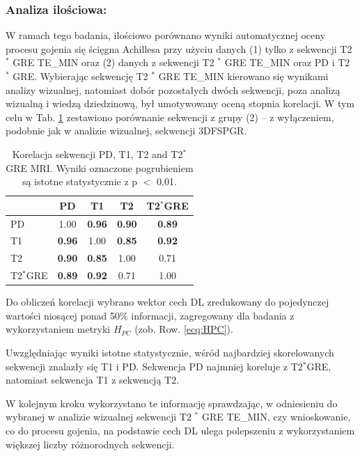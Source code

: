 \subsubsection{Analiza ilościowa:} W ramach tego badania, ilościowo porównano wyniki automatycznej oceny procesu gojenia się ścięgna Achillesa przy użyciu danych (1) tylko z sekwencji T2 $^\ast$ GRE TE\_MIN oraz (2) danych z sekwencji T2 $^\ast$ GRE TE\_MIN oraz PD i T2 $^\ast$ GRE. Wybierając sekwencję T2 $^\ast$ GRE TE\_MIN kierowano się wynikami analizy wizualnej, natomiast dobór pozostałych dwóch sekwencji, poza analizą wizualną i wiedzą dziedzinową, był umotywowany oceną stopnia korelacji. W tym celu w Tab. \ref{tab:inter-protocol-corr} zestawiono porównanie sekwencji z grupy (2) -- z wyłączeniem, podobnie jak w analizie wizualnej, sekwencji 3DFSPGR.

\begin{table}[h]
	\centering
	\setlength{\tabcolsep}{12pt}
	\caption{Korelacja sekwencji PD, T1, T2 and T2$^\ast$ GRE MRI. Wyniki oznaczone pogrubieniem są istotne statystycznie z p $<$ 0.01.}
	\label{tab:inter-protocol-corr}
	\begin{tabular}{l||c|c|c|c}
		& PD & T1 & T2 & T2$^\ast$GRE \\ \hline \hline
		PD & 1.00 & \textbf{0.96} & \textbf{0.90} & \textbf{0.89} \\ \hline
		T1 & \textbf{0.96} & 1.00 & \textbf{0.85} & \textbf{0.92} \\ \hline
		T2 & \textbf{0.90} & \textbf{0.85} & 1.00 & 0.71 \\ \hline
		T2$^\ast$GRE & \textbf{0.89} & \textbf{0.92} & 0.71 & 1.00  %
	\end{tabular}
\end{table} 

Do obliczeń korelacji wybrano wektor cech DL zredukowany do pojedynczej wartości niosącej ponad 50\% informacji, zagregowany dla badania z wykorzystaniem metryki $H_{PC}$ (zob. Row. \ref{ecq:HPC}). 

Uwzględniając wyniki istotne statystycznie, wśród najbardziej skorelowanych sekwencji znalazły się T1 i PD. Sekwencja PD najmniej koreluje z T2$^\ast$GRE, natomiast sekwencja T1 z sekwencją T2. 

W kolejnym kroku wykorzystano te informację sprawdzając, w odniesieniu do wybranej w analizie wizualnej sekwencji T2 $^\ast$ GRE TE\_MIN, czy wnioskowanie, co do procesu gojenia, na podstawie cech DL ulega polepszeniu z wykorzystaniem większej liczby różnorodnych sekwencji. 

